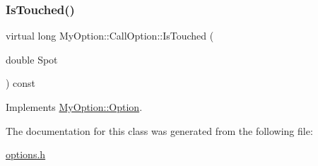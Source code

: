 \subsubsection{\texorpdfstring{Is\+Touched()}{IsTouched()}}
{\footnotesize\ttfamily virtual long My\+Option\+::\+Call\+Option\+::\+Is\+Touched (\begin{DoxyParamCaption}\item[{double}]{Spot }\end{DoxyParamCaption}) const\hspace{0.3cm}{\ttfamily [virtual]}}



Implements \hyperlink{classMyOption_1_1Option_ade57d2fcb9f22f3c2a57d75f55444c33}{My\+Option\+::\+Option}.



The documentation for this class was generated from the following file\+:\begin{DoxyCompactItemize}
\item 
\hyperlink{options_8h}{options.\+h}\end{DoxyCompactItemize}
